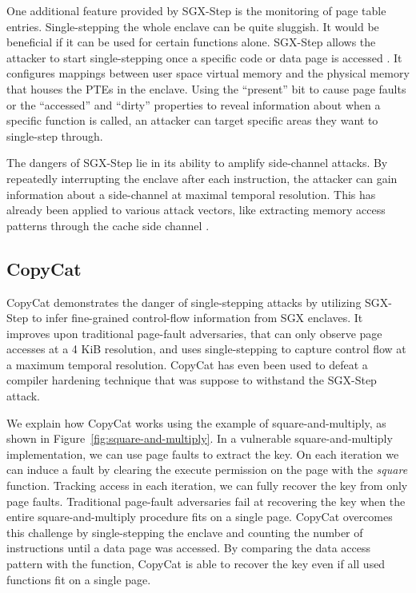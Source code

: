 \documentclass{llncs}
\begin{document}
One additional feature provided by SGX-Step is the monitoring of page table
entries.
Single-stepping the whole enclave can be quite sluggish.
It would be beneficial if it can be used for certain functions alone.
SGX-Step allows the attacker to start single-stepping once a specific code or
data page is accessed \cite{BulckWKPS17}.
It configures mappings between user space virtual memory and the physical
memory that houses the PTEs in the enclave.
Using the ``present'' bit to cause page faults \cite{XuCP15} or the
``accessed'' and ``dirty'' properties to reveal information about when a
specific function is called, an attacker can target specific areas they want to
single-step through.

The dangers of SGX-Step lie in its ability to amplify side-channel attacks.
By repeatedly interrupting the enclave after each instruction, the attacker can
gain information about a side-channel at maximal temporal resolution.
This has already been applied to various attack vectors, like extracting memory
access patterns through the cache side channel \cite{HahnelCP17}.

\subsection{CopyCat}

CopyCat \cite{MoghimiBHPS20} demonstrates the danger of single-stepping attacks
by utilizing SGX-Step to infer fine-grained control-flow information from SGX
enclaves.
It improves upon traditional page-fault adversaries, that can only observe page
accesses at a 4 KiB resolution, and uses single-stepping to capture control
flow at a maximum temporal resolution.
CopyCat has even been used to defeat a compiler hardening technique
\cite{HosseinzadehLLP18} that was suppose to withstand the SGX-Step attack.

We explain how CopyCat works using the example of square-and-multiply,
as shown in Figure~\ref{fig:square-and-multiply}.
In a vulnerable square-and-multiply implementation, we can use page faults to
extract the key.
On each iteration we can induce a fault by clearing the execute permission on
the page with the \emph{square} function.
Tracking access in each iteration, we can fully recover the key from only page
faults.
Traditional page-fault adversaries fail at recovering the key when the entire
square-and-multiply procedure fits on a single page.
CopyCat overcomes this challenge by single-stepping the enclave and counting
the number of instructions until a data page was accessed.
By comparing the data access pattern with the function, CopyCat is able to
recover the key even if all used functions fit on a single page.
\end{document}
